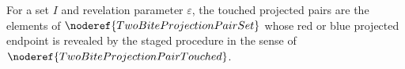 \begin{definition}
For a set \(I\) and revelation parameter \(\varepsilon\), the touched
projected pairs are the elements of \(\noderef{TwoBiteProjectionPairSet}\)
whose red or blue projected endpoint is revealed by the staged procedure in
the sense of \(\noderef{TwoBiteProjectionPairTouched}\).
\end{definition}
